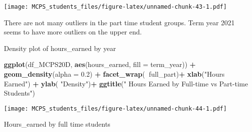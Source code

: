 \documentclass[]{article}
\newenvironment{Shaded}{\begin{snugshade}}{\end{snugshade}}
\newcommand{\DataTypeTok}[1]{\textcolor[rgb]{0.13,0.29,0.53}{#1}}
\newcommand{\FloatTok}[1]{\textcolor[rgb]{0.00,0.00,0.81}{#1}}
\newcommand{\KeywordTok}[1]{\textcolor[rgb]{0.13,0.29,0.53}{\textbf{#1}}}
\newcommand{\NormalTok}[1]{#1}
\newcommand{\OperatorTok}[1]{\textcolor[rgb]{0.81,0.36,0.00}{\textbf{#1}}}
\newcommand{\StringTok}[1]{\textcolor[rgb]{0.31,0.60,0.02}{#1}}
\begin{document}
\texttt{[image: MCPS\_students\_files/figure-latex/unnamed-chunk-43-1.pdf]}

There are not many outliers in the part time student groups. Term year
2021 seems to have more outliers on the upper end.

Density plot of hours\_earned by year

\begin{Shaded}
\begin{Highlighting}[]
\KeywordTok{ggplot}\NormalTok{(df_MCPS20D, }\KeywordTok{aes}\NormalTok{(hours_earned, }\DataTypeTok{fill =}\NormalTok{ term_year)) }\OperatorTok{+}\StringTok{ }\KeywordTok{geom_density}\NormalTok{(}\DataTypeTok{alpha =} \FloatTok{0.2}\NormalTok{) }\OperatorTok{+}
\StringTok{  }\KeywordTok{facet_wrap}\NormalTok{(}\OperatorTok{~}\NormalTok{full_part)}\OperatorTok{+}
\StringTok{  }\KeywordTok{xlab}\NormalTok{(}\StringTok{"Hours Earned"}\NormalTok{) }\OperatorTok{+}
\StringTok{  }\KeywordTok{ylab}\NormalTok{( }\StringTok{"Density"}\NormalTok{)}\OperatorTok{+}
\StringTok{  }\KeywordTok{ggtitle}\NormalTok{(}\StringTok{" Hours Earned by Full-time vs Part-time Students"}\NormalTok{)}
\end{Highlighting}
\end{Shaded}

\texttt{[image: MCPS\_students\_files/figure-latex/unnamed-chunk-44-1.pdf]}

Hours\_earned by full time students

\begin{Shaded}
\end{Shaded}
\end{document}
